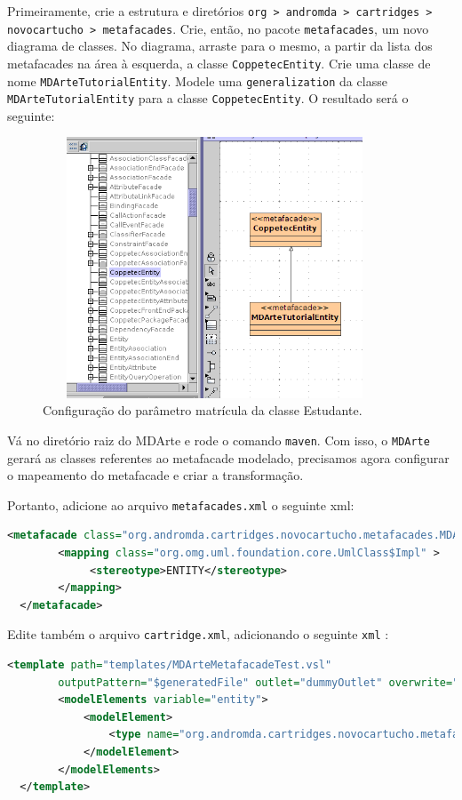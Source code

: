 Primeiramente, crie a estrutura e diretórios \texttt{org > andromda >
cartridges > novocartucho > metafacades}. Crie, então, no pacote
\texttt{metafacades}, um novo diagrama de classes. No diagrama, arraste para o
mesmo, a partir da lista dos metafacades na área à esquerda, a classe
\texttt{CoppetecEntity}. Crie uma classe de nome \texttt{MDArteTutorialEntity}.
Modele uma \texttt{generalization} da classe \texttt{MDArteTutorialEntity} para
a classe \texttt{CoppetecEntity}. O resultado será o seguinte:

\begin{figure}[H]
	\centering
	\includegraphics[width=290pt,height=220pt]{files/imgs/mdarte-novocartucho-metafacade-00.png}
	\caption{Configuração do parâmetro matrícula da classe Estudante.}
	\label{config_parametro}
\end{figure}

Vá no diretório raiz do MDArte e rode o comando \texttt{maven}. Com isso, o
\texttt{MDArte} gerará as classes referentes ao metafacade modelado, precisamos
agora configurar o mapeamento do metafacade e criar a transformação.

Portanto, adicione ao arquivo \texttt{metafacades.xml} o seguinte xml:

\begin{lstlisting}[language=xml]
  <metafacade class="org.andromda.cartridges.novocartucho.metafacades.MDArteTutorialEntityLogicImpl">
        <mapping class="org.omg.uml.foundation.core.UmlClass$Impl" >
        	 <stereotype>ENTITY</stereotype>
        </mapping>
  </metafacade>
\end{lstlisting}

Edite também o arquivo \texttt{cartridge.xml}, adicionando o seguinte
\texttt{xml} :

\begin{lstlisting}[language=xml]
  <template path="templates/MDArteMetafacadeTest.vsl"
		outputPattern="$generatedFile" outlet="dummyOutlet" overwrite="true">
		<modelElements variable="entity">
            <modelElement>
                <type name="org.andromda.cartridges.novocartucho.metafacades.MDArteTutorialEntityLogicImpl" />
            </modelElement>
        </modelElements>
  </template>
\end{lstlisting}


